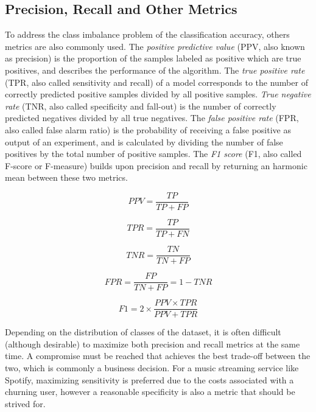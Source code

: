 \documentclass{kththesis}
\begin{document}
\subsection{Precision, Recall and Other Metrics}

To address the class imbalance problem of the classification accuracy, others metrics are also commonly used. The \emph{positive predictive value} (PPV, also known as precision) is the proportion of the samples labeled as positive which are true positives, and describes the performance of the algorithm. The \emph{true positive rate} (TPR, also called sensitivity and recall) of a model corresponds to the number of correctly predicted positive samples divided by all positive samples. \emph{True negative rate} (TNR, also called specificity and fall-out) is the number of correctly predicted negatives divided by all true negatives. The \emph{false positive rate} (FPR, also called false alarm ratio) is the probability of receiving a false positive as output of an experiment, and is calculated by dividing the number of false positives by the total number of positive samples. The \emph{F1 score} (F1, also called F-score or F-measure) builds upon precision and recall by returning an harmonic mean between these two metrics.

\begin{equation}
PPV = \frac{TP}{TP + FP}
\end{equation}

\begin{equation}
TPR = \frac{TP}{TP + FN}
\end{equation}

\begin{equation}
TNR = \frac{TN}{TN + FP}
\end{equation}

\begin{equation}
FPR = \frac{FP}{TN + FP} = 1 - TNR
\end{equation}

\begin{equation}
F1 = 2 \times \frac{PPV \times TPR}{PPV + TPR}
\end{equation}

Depending on the distribution of classes of the dataset, it is often difficult (although desirable) to maximize both precision and recall metrics at the same time. A compromise must be reached that achieves the best trade-off between the two, which is commonly a business decision. For a music streaming service like Spotify, maximizing sensitivity is preferred due to the costs associated with a churning user, however a reasonable specificity is also a metric that should be strived for. 
\end{document}
